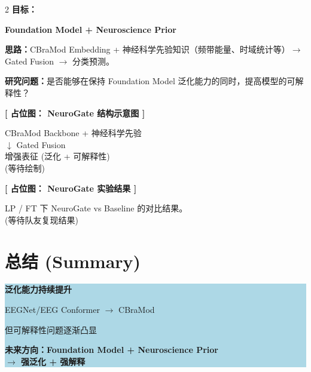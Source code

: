 \documentclass[12pt, a0paper]{article}
\renewcommand{\large}{\fontsize{28}{36}\selectfont}
\renewcommand{\Large}{\fontsize{34}{42}\selectfont}
\renewcommand{\LARGE}{\fontsize{40}{48}\selectfont}
\renewcommand{\small}{\fontsize{18}{24}\selectfont}
\newcommand{\placeholder}[2]{%
    \begin{center}
    \colorbox{mygray!12}{\parbox{0.9\columnwidth}{%
        \centering
        \vspace{1.5em}
        {\Large\bfseries\color{mygray} [ 占位图： #1 ]}
        \vspace{0.8em}

        {\small\color{mygray} #2}
        \vspace{1.5em}
    }}
    \end{center}
}
\begin{document}
\begin{multicols}{2}
\textbf{目标：}

\begin{center}
\Large\bfseries
Foundation Model \quad + \quad Neuroscience Prior
\end{center}

\textbf{思路：}CBraMod Embedding + 神经科学先验知识（频带能量、时域统计等）$\rightarrow$ Gated Fusion $\rightarrow$ 分类预测。

\vspace{1em}

\textbf{研究问题：}是否能够在保持 Foundation Model 泛化能力的同时，提高模型的可解释性？

\placeholder{NeuroGate 结构示意图}{%
    CBraMod Backbone + 神经科学先验\\
    $\downarrow$ Gated Fusion\\
    增强表征 (泛化 + 可解释性)\\
    \small (等待绘制)}

\placeholder{NeuroGate 实验结果}{%
    LP / FT 下 NeuroGate vs Baseline 的对比结果。\\
    \small (等待队友复现结果)}

\section{总结 (Summary)}

\begin{center}
\colorbox{lightblue}{\parbox{0.95\columnwidth}{\centering
    {\LARGE\bfseries
        泛化能力持续提升\par}
    \vspace{1.5em}
    {\large
        EEGNet/EEG Conformer $\rightarrow$ CBraMod\par}
    \vspace{1em}
    {\large
        但可解释性问题逐渐凸显\par}
    \vspace{1.5em}
    {\large\bfseries
        未来方向：Foundation Model + Neuroscience Prior\\[2mm]
        $\rightarrow$ 强泛化 + 强解释\par}
}}
\end{center}

\vspace{1em}

\end{multicols}
\end{document}
